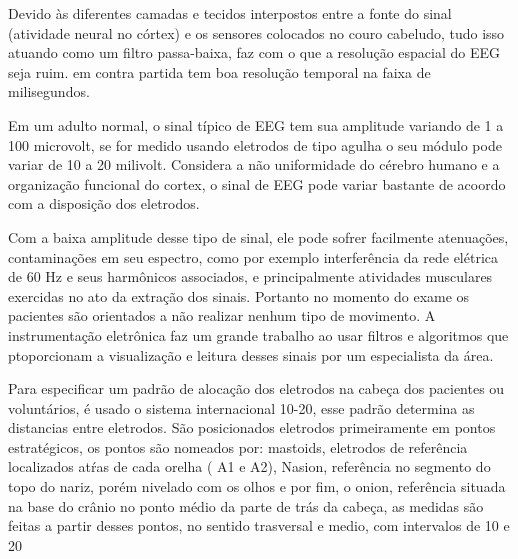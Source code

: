 Devido às diferentes camadas e tecidos interpostos entre a fonte do sinal
 (atividade neural no córtex) e os sensores colocados no couro cabeludo, tudo
 isso atuando como um filtro passa-baixa, faz com o que a resolução 
espacial do EEG seja ruim.%
em contra partida tem boa resolução temporal na faixa de milisegundos.
 
Em um adulto normal, o sinal típico de EEG tem sua amplitude variando
 de 1 a 100 microvolt, se for medido usando eletrodos de tipo agulha 
 o seu módulo pode variar de 10 a 20 milivolt. Considera a não uniformidade
 do cérebro humano e a organização funcional do cortex, o sinal de EEG pode
 variar bastante de acoordo com a disposição dos eletrodos.

Com a baixa amplitude desse tipo de sinal, ele pode sofrer facilmente atenuações,
 contaminações em seu espectro, como por exemplo interferência da rede elétrica de
 60 Hz e seus harmônicos associados, e principalmente atividades musculares exercidas
 no ato da extração dos sinais. Portanto no momento do exame os pacientes são
 orientados a não realizar nenhum tipo de movimento. A instrumentação eletrônica
 faz um grande trabalho ao usar filtros e algoritmos que ptoporcionam a
 visualização e leitura desses sinais por um especialista da área.


Para especificar um padrão de alocação dos eletrodos na cabeça dos pacientes
 ou voluntários, é usado o sistema internacional 10-20, esse padrão determina 
as distancias entre eletrodos. São posicionados eletrodos primeiramente em pontos
 estratégicos, os pontos são nomeados por: mastoids, eletrodos de referência
 localizados atŕas de cada orelha ( A1 e A2),
Nasion, referência no segmento do topo do nariz, porém nivelado com os olhos
 e por fim, o onion, referência situada na base do crânio no ponto médio da
 parte de trás da cabeça, as medidas são feitas a partir desses pontos, no sentido
 trasversal e medio,  com intervalos de 10 e 20 %

